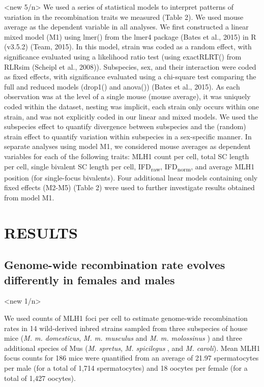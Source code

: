 \documentclass[
]{article}
\begin{document}
\textless new 5/n\textgreater{} We used a series of statistical models
to interpret patterns of variation in the recombination traits we
measured (Table 2). We used mouse average as the dependent variable in
all analyses. We first constructed a linear mixed model (M1) using
lmer() from the lmer4 package (Bates et al., 2015) in R (v3.5.2) (Team,
2015). In this model, strain was coded as a random effect, with
significance evaluated using a likelihood ratio test (using exactRLRT()
from RLRsim (Scheipl et al., 2008)). Subspecies, sex, and their
interaction were coded as fixed effects, with significance evaluated
using a chi-square test comparing the full and reduced models (drop1()
and anova()) (Bates et al., 2015). As each observation was at the level
of a single mouse (mouse average), it was uniquely coded within the
dataset, nesting was implicit, each strain only occurs within one
strain, and was not explicitly coded in our linear and mixed models. We
used the subspecies effect to quantify divergence between subspecies and
the (random) strain effect to quantify variation within subspecies in a
sex-specific manner. In separate analyses using model M1, we considered
mouse averages as dependent variables for each of the following traits:
MLH1 count per cell, total SC length per cell, single bivalent SC length
per cell, IFD\textsubscript{raw}, IFD\textsubscript{norm}, and average
MLH1 position (for single-focus bivalents). Four additional lnear models
containing only fixed effects (M2-M5) (Table 2) were used to further
investigate results obtained from model M1.

\hypertarget{results}{%
\section{RESULTS}\label{results}}

\hypertarget{genome-wide-recombination-rate-evolves-differently-in-females-and-males}{%
\subsection{Genome-wide recombination rate evolves differently in
females and
males}\label{genome-wide-recombination-rate-evolves-differently-in-females-and-males}}

\textless new 1/n\textgreater{}

We used counts of MLH1 foci per cell to estimate genome-wide
recombination rates in 14 wild-derived inbred strains sampled from three
subspecies of house mice (\emph{M. m. domesticus}, \emph{M. m. musculus}
and \emph{M. m. molossinus} ) and three additional species of Mus
(\emph{M. spretus}, \emph{M. spicilegus} , and \emph{M. caroli}). Mean
MLH1 focus counts for 186 mice were quantified from an average of 21.97
spermatocytes per male (for a total of 1,714 spermatocytes) and 18
oocytes per female (for a total of 1,427 oocytes).
\end{document}
